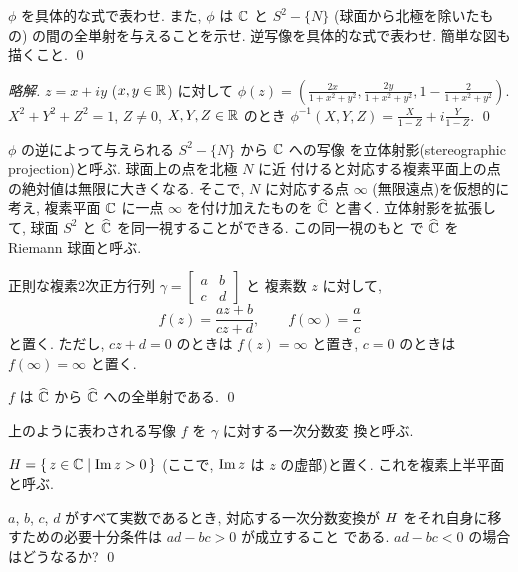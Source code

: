 \documentclass[12pt,twoside]{jarticle}
\newcommand\commentout[1]{#1}
\newcommand\commentout[1]{}
\begin{document}
\begin{question}
  $\phi$ を具体的な式で表わせ. 
  また, $\phi$ は ${\mathbb C}$ と $S^2-\{N\}$ (球面から北極を除いたもの)
  の間の全単射を与えることを示せ. 逆写像を具体的な式で表わせ.
  簡単な図も描くこと. \qed
\end{question}

\commentout{
\begin{proof}[略解]
 $z=x+iy$ ($x,y\in{\mathbb R}$) に対して %
 $\phi(z)=\left(\frac{2x}{1+x^2+y^2},\frac{2y}{1+x^2+y^2},1-\frac{2}{1+x^2+y^2}\right)$.
 $X^2+Y^2+Z^2=1$, $Z\ne 0$, $X,Y,Z\in{\mathbb R}$ のとき %
 $\phi^{-1}(X,Y,Z)=\frac{X}{1-Z}+i\frac{Y}{1-Z}$.
 \qed
\end{proof}
}

\noindent $\phi$ の逆によって与えられる $S^2-\{N\}$ から ${\mathbb C}$ への写像
を立体射影(stereographic projection)と呼ぶ. 球面上の点を北極 $N$ に近
付けると対応する複素平面上の点の絶対値は無限に大きくなる. そこで, $N$ 
に対応する点 $\infty$ (無限遠点)を仮想的に考え, 複素平面 ${\mathbb C}$ に一点 
$\infty$ を付け加えたものを $\widehat{{\mathbb C}}$ と書く. 立体射影を拡張して, 
球面 $S^2$ と $\widehat{{\mathbb C}}$ を同一視することができる. この同一視のもと
で $\widehat{{\mathbb C}}$ を Riemann 球面と呼ぶ.


正則な複素2次正方行列 %
\( \gamma = \begin{bmatrix} a & b \\ c & d \end{bmatrix} \) と 
複素数 $z$ に対して, 
\[%
  f(z) = \frac{az + b}{cz + d},
  \qquad
  f(\infty) = \frac{a}{c}
\]%
と置く. ただし, $cz+d=0$ のときは $f(z)=\infty$ と置き, $c=0$ のときは
$f(\infty)=\infty$ と置く. 

\begin{question}
  $f$ は $\widehat{{\mathbb C}}$ から $\widehat{{\mathbb C}}$ への全単射である. \qed
\end{question}

\noindent 上のように表わされる写像 $f$ を $\gamma$ に対する一次分数変
換と呼ぶ.

$H = \{\,z\in{\mathbb C} \mid \mathop{\mathrm{Im}}\nolimits z > 0\,\}$ (ここで, $\mathop{\mathrm{Im}}\nolimits z$ は $z$ 
の虚部)と置く. これを複素上半平面と呼ぶ. 

\begin{question}
  $a$, $b$, $c$, $d$ がすべて実数であるとき, 対応する一次分数変換が 
  $H$ をそれ自身に移すための必要十分条件は $ad-bc>0$ が成立すること
  である. $ad-bc<0$ の場合はどうなるか? \qed
\end{question}

\end{document}
